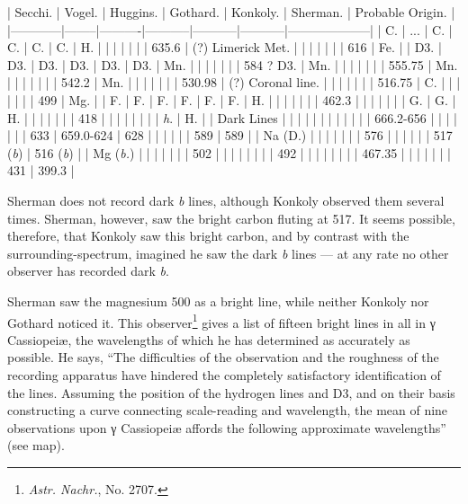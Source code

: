 \documentclass[a4paper, 12pt, oneside, polutonikogreek, english]{article}
\begin{document}
| Secchi.  | Vogel. | Huggins. | Gothard. | Konkoly. | Sherman. | Probable Origin.  |
|------------|--------|----------|-----------|-----------|-----------|--------------------|
| C.     | ...  | C.    | C.    | C.    | C.    | H.         |
|      |    |     |      |      | 635.6   | (?) Limerick Met. |
|      |    |     |      |      | 616    | Fe.        |
| D3.    | D3.  | D3.   | D3.    | D3.    | D3.    | Mn.        |
|      |    |     |      |      | 584 ? D3. | Mn.        |
|      |    |     |      |      | 555.75  | Mn.        |
|      |    |     |      |      | 542.2   | Mn.        |
|      |    |     |      |      | 530.98  | (?) Coronal line. |
|      |    |     |      |      | 516.75  | C.         |
|      |    |     |      |      | 499    | Mg.        |
| F.     | F.   | F.    | F.    | F.    | F.    | H.         |
|      |    |     |      |      | 462.3   |          |
|      |    |     |      | G.    | G.    | H.         |
|      |    |     |      |      | 418    |          |
|      |    |     |      |      | \emph{h}.   | H.         |
| Dark Lines |    |     |      |      |      |          |
|      |    |     |      | 666.2-656 |      |          |
|      |    |     | 633    | 659.0-624 | 628    |          |
|      |    |     | 589    | 589    |      | Na (D.)      |
|      |    |     |      |      | 576    |          |
|      |    |     | 517 (\emph{b}) | 516 (\emph{b}) |      | Mg (\emph{b.})     |
|      |    |     |      |      | 502    |          |
|      |    |     |      |      | 492    |          |
|      |    |     |      |      | 467.35  |          |
|      |    |     |      | 431    | 399.3   |

Sherman does not record dark \emph{b} lines, although Konkoly observed them several times. Sherman, however, saw the bright carbon fluting at 517. It seems possible, therefore, that Konkoly saw this bright carbon, and by contrast with the surrounding-spectrum, imagined he saw the dark \emph{b} lines --- at any rate no other observer has recorded dark \emph{b}.

Sherman saw the magnesium 500 as a bright line, while neither Konkoly nor Gothard noticed it. This observer\footnote{\emph{Astr. Nachr.}, No. 2707.} gives a list of fifteen bright lines in all in γ Cassiopeiæ, the wavelengths of which he has determined as accurately as possible. He says, ``The difficulties of the observation and the roughness of the recording apparatus have hindered the completely satisfactory identification of the lines. Assuming the position of the hydrogen lines and D3, and on their basis constructing a curve connecting scale-reading and wavelength, the mean of nine observations upon γ Cassiopeiæ affords the following approximate wavelengths'' (see map).
\end{document}
